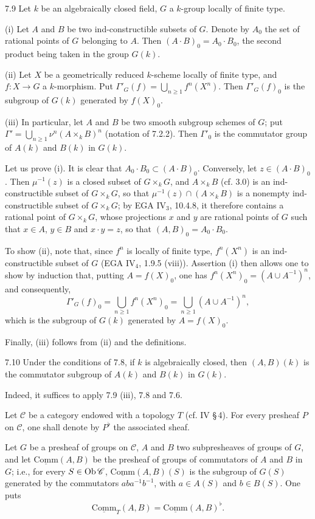 \begin{proposition}{7.9}\label{VIB.7.9}
Let $k$ be an algebraically closed field, $G$ a $k$-group locally of finite type.

(i) Let $A$ and $B$ be two ind-constructible subsets of $G$. Denote by $A_0$ the set of rational points of $G$ belonging to $A$. Then $(A\cdot B)_0=A_0\cdot B_0$, the second product being taken in the group $G(k)$.

(ii) Let $X$ be a geometrically reduced $k$-scheme locally of finite type, and $f:X\to G$ a $k$-morphism. Put $\Gamma'_G(f)=\bigcup_{n\geq1}f^n(X^n)$. Then $\Gamma'_G(f)_0$ is the subgroup of $G(k)$ generated by $f(X)_0$.

(iii) In particular, let $A$ and $B$ be two smooth subgroup schemes of $G$; put $\Gamma'=\bigcup_{n\geq1}\nu^n(A\times_k B)^n$ (notation of 7.2.2). Then $\Gamma'_0$ is the commutator group of $A(k)$ and $B(k)$ in $G(k)$.
\end{proposition}
Let us prove (i). It is clear that $A_0\cdot B_0\subset(A\cdot B)_0$. Conversely, let $z\in(A\cdot B)_0$. Then $\mu^{-1}(z)$ is a closed subset of $G\times_k G$, and $A\times_k B$ (cf. 3.0) is an ind-constructible subset of $G\times_k G$, so that $\mu^{-1}(z)\cap(A\times_k B)$ is a nonempty ind-constructible subset of $G\times_k G$; by EGA IV$_3$, 10.4.8, it therefore contains a rational point of $G\times_k G$, whose projections $x$ and $y$ are rational points of $G$ such that $x\in A$, $y\in B$ and $x\cdot y=z$, so that $(A,B)_0=A_0\cdot B_0$.

To show (ii), note that, since $f^n$ is locally of finite type, $f^n(X^n)$ is an ind-constructible subset of $G$ (EGA IV$_4$, 1.9.5 (viii)). Assertion (i) then allows one to show by induction that, putting $A=f(X)_0$, one has $f^n(X^n)_0=(A\cup A^{-1})^n$, and consequently,
\[
\Gamma'_G(f)_0=\bigcup_{n\geq1}f^n(X^n)_0=\bigcup_{n\geq1}(A\cup A^{-1})^n,
\]
which is the subgroup of $G(k)$ generated by $A=f(X)_0$.

Finally, (iii) follows from (ii) and the definitions.

\begin{corollary}{7.10}\label{VIB.7.10}
Under the conditions of 7.8, if $k$ is algebraically closed, then $(A,B)(k)$ is the commutator subgroup of $A(k)$ and $B(k)$ in $G(k)$.
\end{corollary}
Indeed, it suffices to apply 7.9 (iii), 7.8 and 7.6.

\label{VIB.8.1}
Let $\mathscr C$ be a category endowed with a topology $T$ (cf. IV \S\,4). For every presheaf $P$ on $\mathscr C$, one shall denote by $P^\flat$ the associated sheaf.

Let $G$ be a presheaf of groups on $\mathscr C$, $A$ and $B$ two subpresheaves of groups of $G$, and let $\underline{\mathrm{Comm}}(A,B)$ be the presheaf of groups of commutators of $A$ and $B$ in $G$; i.e., for every $S\in\operatorname{Ob}\mathscr C$, $\underline{\mathrm{Comm}}(A,B)(S)$ is the subgroup of $G(S)$ generated by the commutators $aba^{-1}b^{-1}$, with $a\in A(S)$ and $b\in B(S)$. One puts
\[
\underline{\mathrm{Comm}}_T(A,B)=\underline{\mathrm{Comm}}(A,B)^\flat.
\]
